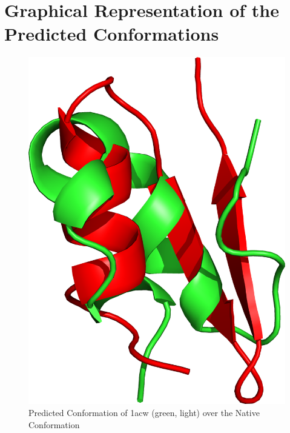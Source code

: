 \chapter{Graphical Representation of the Predicted Conformations}\label{appendix:visual}

\begin{figure}[ht]
    \centering
    \includegraphics[width=0.9\linewidth]{Figuras/prots/1acw_render.png}
    \caption{Predicted Conformation of 1acw (green, light) over the Native Conformation}
    \label{fig:1acw-visual}
\end{figure}

